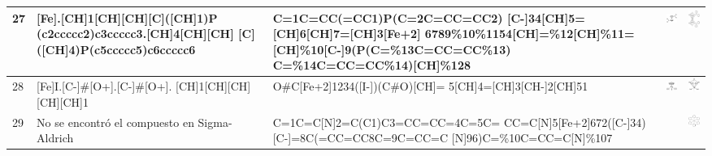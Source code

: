 \begin{landscape}
\begin{longtable}{m{0.3cm}m{6.7cm}m{7.7cm}m{2.3cm}m{2.3cm}}
 27 &
 [Fe].[CH]1[CH][CH][C]([CH]1)P (c2ccccc2)c3ccccc3.[CH]4[CH][CH] [C]([CH]4)P(c5ccccc5)c6ccccc6 & 
 C=1C=CC(=CC1)P(C=2C=CC=CC2) [C-]34[CH]5=[CH]6[CH]7=[CH]3[Fe+2] 6789\%10\%1154[CH]=\%12[CH]\%11= [CH]\%10[C-]9(P(C=\%13C=CC=CC\%13) C=\%14C=CC=CC\%14)[CH]\%128 & 
 \includegraphics[width=2.2cm]{imagenes/sigmaAldrich/DPPF.png} & 
 \includegraphics[width=2.2cm]{imagenes/sciFinder/pdf/DPPF.pdf} \\
\hline

 28 &
 [Fe]I.[C-]\#[O+].[C-]\#[O+]. [CH]1[CH][CH][CH][CH]1 & 
 O\#C[Fe+2]1234([I-])(C\#O)[CH]= 5[CH]4=[CH]3[CH-]2[CH]51 & 
 \includegraphics[width=2.2cm]{imagenes/sigmaAldrich/Dicarbonylcyclopentadienyliodoiron(II).png} & 
 \includegraphics[width=2.2cm]{imagenes/sciFinder/pdf/Dicarbonylcyclopentadienyliodoiron(II).pdf} \\
\hline

 29 &
 No se encontró el compuesto en Sigma-Aldrich & 
 C=1C=C[N]2=C(C1)C3=CC=CC=4C=5C= CC=C[N]5[Fe+2]672([C-]34)[C-]=8C(=CC=CC8C=9C=CC=C [N]96)C=\%10C=CC=C[N]\%107 & 
 & 
 \includegraphics[width=2.2cm]{imagenes/sciFinder/pdf/(OC-6-11)-Bis[2,6-di(2-pyridinyl-ÎºN)phenyl-ÎºC]iron.pdf}
\label{tabla:tabla_grande_apendice}

\end{longtable}

\end{landscape}


